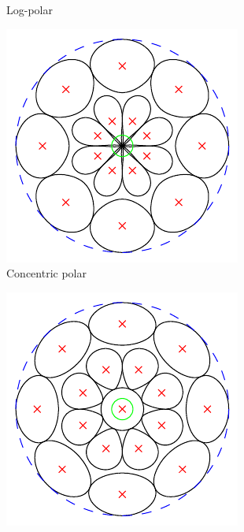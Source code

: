 \documentclass[thesis.tex]{subfiles}
\begin{document}
\begin{figure}[p]
\begin{subfigure}[t]{0.30\textwidth}
		\caption{Log-polar}
		\label{fig:gridTypeLp}
	\end{subfigure}
	\begin{subfigure}[t]{0.30\textwidth}
		\includegraphics[width=\textwidth]{img/gridType_concentric_polar_polar_gaussian.pdf}
		\caption{Concentric polar}
		\label{fig:gridTypeCp}
	\end{subfigure}
	\begin{subfigure}[t]{0.30\textwidth}
		\includegraphics[width=\textwidth]{img/gridType_concentric_polar_central_polar_gaussian.pdf}

\end{subfigure}
\end{figure}
\end{document}
